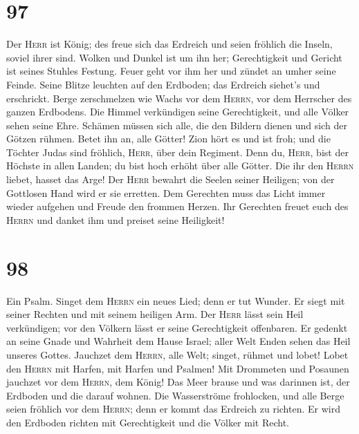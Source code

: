 \hypertarget{section-96}{%
\section{97}\label{section-96}}

 Der \textsc{Herr} ist König; des freue sich das Erdreich
und seien fröhlich die Inseln, soviel ihrer sind.  Wolken
und Dunkel ist um ihn her; Gerechtigkeit und Gericht ist seines Stuhles
Festung.  Feuer geht vor ihm her und zündet an umher seine
Feinde.  Seine Blitze leuchten auf den Erdboden; das
Erdreich siehet's und erschrickt.  Berge zerschmelzen wie
Wachs vor dem \textsc{Herrn}, vor dem Herrscher des ganzen Erdbodens.
 Die Himmel verkündigen seine Gerechtigkeit, und alle
Völker sehen seine Ehre.  Schämen müssen sich alle, die
den Bildern dienen und sich der Götzen rühmen. Betet ihn an, alle
Götter!  Zion hört es und ist froh; und die Töchter Judas
sind fröhlich, \textsc{Herr}, über dein Regiment.  Denn
du, \textsc{Herr}, bist der Höchste in allen Landen; du bist hoch erhöht
über alle Götter.  Die ihr den \textsc{Herrn} liebet,
hasset das Arge! Der \textsc{Herr} bewahrt die Seelen seiner Heiligen;
von der Gottlosen Hand wird er sie erretten.  Dem
Gerechten muss das Licht immer wieder aufgehen und Freude den frommen
Herzen.  Ihr Gerechten freuet euch des \textsc{Herrn} und
danket ihm und preiset seine Heiligkeit!

\hypertarget{section-97}{%
\section{98}\label{section-97}}

 Ein Psalm. Singet dem \textsc{Herrn} ein neues Lied; denn
er tut Wunder. Er siegt mit seiner Rechten und mit seinem heiligen Arm.
 Der \textsc{Herr} lässt sein Heil verkündigen; vor den
Völkern lässt er seine Gerechtigkeit offenbaren.  Er
gedenkt an seine Gnade und Wahrheit dem Hause Israel; aller Welt Enden
sehen das Heil unseres Gottes.  Jauchzet dem
\textsc{Herrn}, alle Welt; singet, rühmet und lobet! 
Lobet den \textsc{Herrn} mit Harfen, mit Harfen und Psalmen!
 Mit Drommeten und Posaunen jauchzet vor dem
\textsc{Herrn}, dem König!  Das Meer brause und was
darinnen ist, der Erdboden und die darauf wohnen.  Die
Wasserströme frohlocken, und alle Berge seien fröhlich 
vor dem \textsc{Herrn}; denn er kommt das Erdreich zu richten. Er wird
den Erdboden richten mit Gerechtigkeit und die Völker mit Recht.

